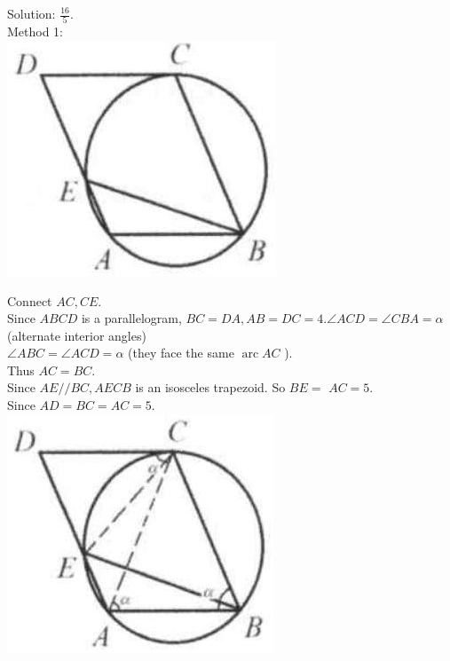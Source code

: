 \documentclass[10pt]{article}
\begin{document}
Solution: \(\frac{16}{5}\).\\
Method 1:\\
\includegraphics[max width=\textwidth, center]{2025_04_17_97bc1f7e44d93c271a88g-167}

Connect \(A C, C E\).\\
Since \(A B C D\) is a parallelogram, \(B C=D A, A B=D C=4 . \angle A C D=\angle C B A=\alpha\) (alternate interior angles)\\
\(\angle A B C=\angle A C D=\alpha\) (they face the same \(\operatorname{arc} A C\) ).\\
Thus \(A C=B C\).\\
Since \(A E / / B C, A E C B\) is an isosceles trapezoid. So \(B E=\) \(A C=5\).\\
Since \(A D=B C=A C=5\).\\
\includegraphics[max width=\textwidth, center]{2025_04_17_97bc1f7e44d93c271a88g-167(2)}
\end{document}
